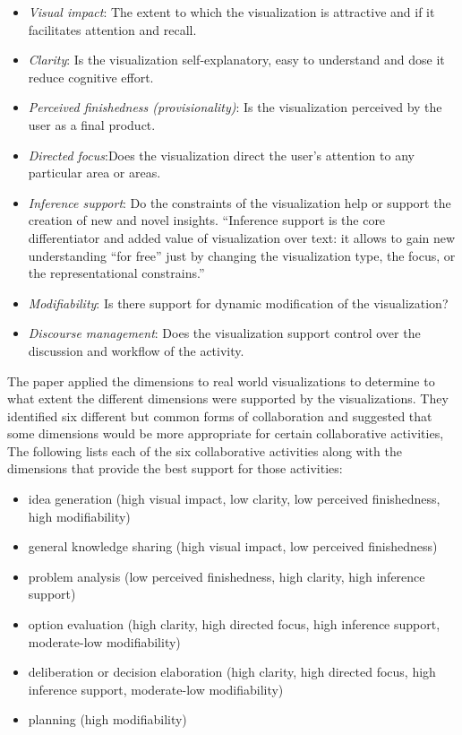 \documentclass{sig-alternate}
\begin{document}
  \begin{itemize}
    \item \emph{Visual impact}: The extent to which the visualization is
    attractive and if it facilitates attention and recall. \item \emph{Clarity}:
    Is the visualization self-explanatory, easy to understand and dose it reduce
    cognitive effort. \item \emph{Perceived finishedness (provisionality)}: Is
    the visualization perceived by the user as a final product. \item
    \emph{Directed focus}:Does the visualization direct the user's attention to
    any particular area or areas. \item \emph{Inference support}: Do the
    constraints of the visualization help or  support the creation of new and
    novel insights. ``Inference support is the core differentiator and added
    value of visualization over text: it allows to gain new understanding ``for
    free'' just by changing the visualization type, the focus, or the
    representational constrains.'' \cite{Bresciani:ACollaborativeDimensionsFramework} 
    \item \emph{Modifiability}: Is there support for dynamic modification of
    the visualization? 
    \item \emph{Discourse management}: Does the visualization support control
    over the discussion and workflow of the activity.
    \end{itemize}
    The paper applied the dimensions to real world visualizations to determine
    to what extent the different dimensions were supported by the
    visualizations. They identified six different but common forms of
    collaboration and suggested that some dimensions would be more appropriate
    for certain collaborative activities, The following lists each of the six
    collaborative activities along with the dimensions that provide the best
    support for those activities:
    \begin{itemize}
      \item idea generation (high visual impact, low clarity, low perceived
      finishedness, high modifiability) \item general knowledge sharing (high
      visual impact, low perceived finishedness)
  \item problem analysis (low perceived finishedness, high clarity, high
  inference support) \item option evaluation (high clarity, high directed focus,
  high inference support, moderate-low modifiability) \item deliberation or
  decision elaboration (high clarity, high directed focus, high inference
  support, moderate-low modifiability)

  \item planning (high modifiability)
  \end{itemize}
\end{document}
